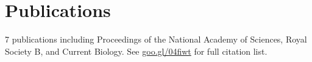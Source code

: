 \documentclass[]{Finlay_Maguire_CV}
\begin{document}
\begin{minipage}[t]{0.66\textwidth}

\section{Publications} 
%
%
7 publications including Proceedings of the National Academy of Sciences, Royal Society B, and Current Biology.
See \url{goo.gl/04fiwt} for full citation list.

\end{minipage} 
\end{document}
